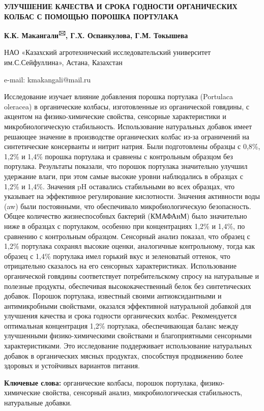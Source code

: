 {\bfseries УЛУЧШЕНИЕ КАЧЕСТВА И СРОКА ГОДНОСТИ ОРГАНИЧЕСКИХ КОЛБАС С
ПОМОЩЬЮ ПОРОШКА ПОРТУЛАКА}

{\bfseries К.К. Макангали\textsuperscript{🖂}, Г.Х. Оспанкулова, Г.М.
Токышева}

НАО «Казахский агротехнический исследовательский университет
им.С.Сейфуллина», Астана, Казахстан

e-mail: kmakangali@mail.ru

Исследование изучает влияние добавления порошка портулака (Portulaca
oleracea) в органические колбасы, изготовленные из органической
говядины, с акцентом на физико-химические свойства, сенсорные
характеристики и микробиологическую стабильность. Использование
натуральных добавок имеет решающее значение в производстве органических
колбас из-за ограничений на синтетические консерванты и нитрит натрия.
Были подготовлены образцы с 0,8\%, 1,2\% и 1,4\% порошка портулака и
сравнены с контрольным образцом без портулака. Результаты показали, что
порошок портулака значительно улучшил удержание влаги, при этом самые
высокие уровни наблюдались в образцах с 1,2\% и 1,4\%. Значения pH
оставались стабильными во всех образцах, что указывает на эффективное
регулирование кислотности. Значения активности воды (aw) были
постоянными, что обеспечивало микробиологическую безопасность. Общее
количество жизнеспособных бактерий (КМАФАнМ) было значительно ниже в
образцах с портулаком, особенно при концентрациях 1,2\% и 1,4\%, по
сравнению с контрольным образцом. Сенсорный анализ показал, что образец
с 1,2\% портулака сохранял высокие оценки, аналогичные контрольному,
тогда как образец с 1,4\% портулака имел горький вкус и зеленоватый
оттенок, что отрицательно сказалось на его сенсорных характеристиках.
Использование органической говядины соответствует потребительскому
спросу на натуральные и полезные продукты, обеспечивая
высококачественный белок без синтетических добавок. Порошок портулака,
известный своими антиоксидантными и антимикробными свойствами, оказался
эффективной натуральной добавкой для улучшения качества и срока годности
органических колбас. Рекомендуется оптимальная концентрация 1,2\%
портулака, обеспечивающая баланс между улучшенными физико-химическими
свойствами и благоприятными сенсорными характеристиками. Это
исследование поддерживает использование натуральных добавок в
органических мясных продуктах, способствуя продвижению более здоровых и
устойчивых вариантов питания.

{\bfseries Ключевые слова:} органические колбасы, порошок портулака,
физико-химические свойства, сенсорный анализ, микробиологическая
стабильность, натуральные добавки.

